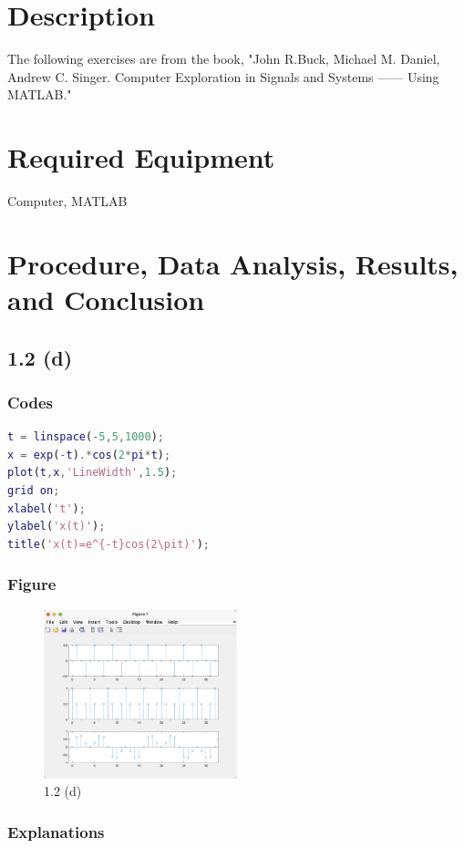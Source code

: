 \documentclass[12pt]{article}
\begin{document}
\section{Description}
The following exercises are from the book, "John R.Buck, Michael M. Daniel, Andrew C. Singer. Computer Exploration in Signals and Systems —— Using MATLAB."

\section{Required Equipment}
Computer, MATLAB

\section{Procedure, Data Analysis, Results, and Conclusion}

\subsection{1.2 (d)}
\subsubsection{Codes}
\begin{lstlisting}[language=MATLAB]
t = linspace(-5,5,1000);
x = exp(-t).*cos(2*pi*t);
plot(t,x,'LineWidth',1.5);
grid on;
xlabel('t');
ylabel('x(t)');
title('x(t)=e^{-t}cos(2\pit)');
\end{lstlisting}

\subsubsection{Figure}
\begin{figure}[h]
    \centering
    \includegraphics[width=0.5\textwidth]{imgs/1-2b.png}
    \caption{1.2 (d)}
    \label{fig_1.2d}
\end{figure}

\subsubsection{Explanations}
\end{document}
